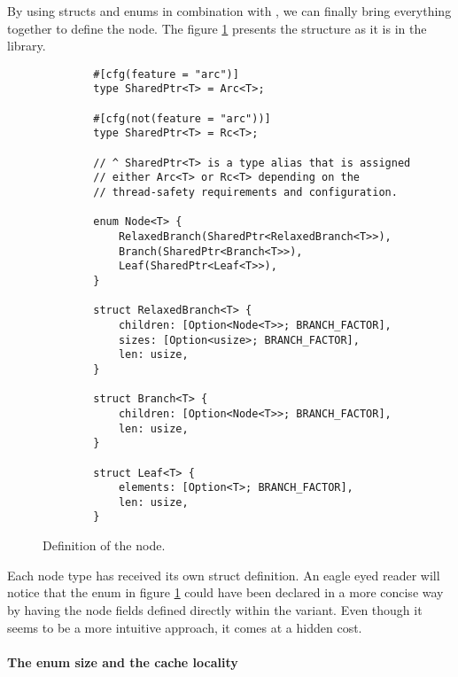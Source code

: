 By using structs and enums in combination with \rc{}, we can finally bring everything together to define the \rrbtree{} node. The figure \ref{fig:rrbtree-node} presents the structure as it is in the library.

\begin{figure}[!htbp]
    \centering

    \begin{verbatim}
        #[cfg(feature = "arc")]
        type SharedPtr<T> = Arc<T>;

        #[cfg(not(feature = "arc"))]
        type SharedPtr<T> = Rc<T>;

        // ^ SharedPtr<T> is a type alias that is assigned
        // either Arc<T> or Rc<T> depending on the
        // thread-safety requirements and configuration.

        enum Node<T> {
            RelaxedBranch(SharedPtr<RelaxedBranch<T>>),
            Branch(SharedPtr<Branch<T>>),
            Leaf(SharedPtr<Leaf<T>>),
        }

        struct RelaxedBranch<T> {
            children: [Option<Node<T>>; BRANCH_FACTOR],
            sizes: [Option<usize>; BRANCH_FACTOR],
            len: usize,
        }

        struct Branch<T> {
            children: [Option<Node<T>>; BRANCH_FACTOR],
            len: usize,
        }

        struct Leaf<T> {
            elements: [Option<T>; BRANCH_FACTOR],
            len: usize,
        }
    \end{verbatim}

    \caption{Definition of the \rrbtree{} node.}
    \label{fig:rrbtree-node}
\end{figure}

Each node type has received its own struct definition. An eagle eyed reader will notice that the  enum in figure \ref{fig:rrbtree-node} could have been declared in a more concise way by having the node fields defined directly within the variant. Even though it seems to be a more intuitive approach, it comes at a hidden cost.

\paragraph{The enum size and the cache locality}

